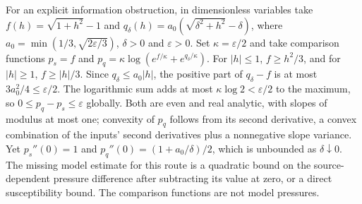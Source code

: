 \documentclass[11pt]{article}
\begin{document}
For an explicit information obstruction, in dimensionless variables take $f(h)=\sqrt{1+h^2}-1$ and $q_\delta(h)=a_0(\sqrt{\delta^2+h^2}-\delta)$, where $a_0=\min(1/3,\sqrt{2\varepsilon/3})$, $\delta>0$ and $\varepsilon>0$. Set $\kappa=\varepsilon/2$ and take comparison functions $p_s=f$ and $p_q=\kappa\log(e^{f/\kappa}+e^{q_\delta/\kappa})$. For $|h|\le1$, $f\ge h^2/3$, and for $|h|\ge1$, $f\ge |h|/3$. Since $q_\delta\le a_0|h|$, the positive part of $q_\delta-f$ is at most $3a_0^2/4\le\varepsilon/2$. The logarithmic sum adds at most $\kappa\log2<\varepsilon/2$ to the maximum, so $0\le p_q-p_s\le\varepsilon$ globally. Both are even and real analytic, with slopes of modulus at most one; convexity of $p_q$ follows from its second derivative, a convex combination of the inputs' second derivatives plus a nonnegative slope variance. Yet $p_s''(0)=1$ and $p_q''(0)=(1+a_0/\delta)/2$, which is unbounded as $\delta\downarrow0$. The missing model estimate for this route is a quadratic bound on the source-dependent pressure difference after subtracting its value at zero, or a direct susceptibility bound. The comparison functions are not model pressures.
\end{document}
